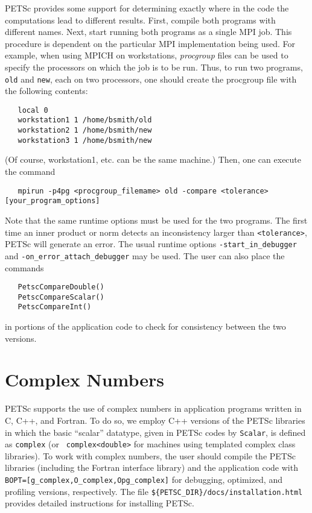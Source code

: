 PETSc provides some support for determining exactly where in the code
the computations lead to different results. First, compile both programs
with different names.  Next, start running
both programs as a single MPI job. This procedure is dependent on the particular
MPI implementation being used.
For example, when using MPICH on workstations, 
{\em procgroup} files can be used to specify the processors on which the job is
to be run.  Thus, to run two programs, {\tt old} and {\tt new},
each on two processors, one should create the procgroup file with the
following contents:
\begin{verbatim}
   local 0
   workstation1 1 /home/bsmith/old
   workstation2 1 /home/bsmith/new
   workstation3 1 /home/bsmith/new
\end{verbatim}
(Of course, workstation1, etc. can be the same machine.) Then, one can
execute the command
\begin{verbatim}
   mpirun -p4pg <procgroup_filemame> old -compare <tolerance> [your_program_options]
\end{verbatim}
Note that the same runtime options must be used for the two programs.
The first time an inner product or norm detects an inconsistency larger
than {\tt <tolerance>}, PETSc will generate an error. The usual runtime
options {\tt -start\_in\_debugger} and {\tt -on\_error\_attach\_debugger} may 
be used.   The user can also place the commands 
\begin{verbatim}
   PetscCompareDouble()
   PetscCompareScalar()
   PetscCompareInt()
\end{verbatim}
  
in portions of the application code to check for consistency between
the two versions.
 
\section{Complex Numbers}  \label{sec:complex}

PETSc supports the use of complex numbers in application programs
written in C, C++, and Fortran.  To do so, we employ C++ versions of
the PETSc libraries in which the basic ``scalar'' datatype, given in
PETSc codes by {\tt Scalar}, is defined as {\tt complex} (or {\tt
complex<double>} for machines using templated complex class
libraries).  To work with complex numbers,
the user should compile the PETSc libraries (including the Fortran
interface library) and the application code with
{\tt BOPT=[g\_complex,O\_complex,Opg\_complex]} for debugging, optimized,
and profiling versions, respectively.  The file {\tt \$\{PETSC\_DIR\}/docs/installation.html}
provides detailed instructions for installing PETSc.


